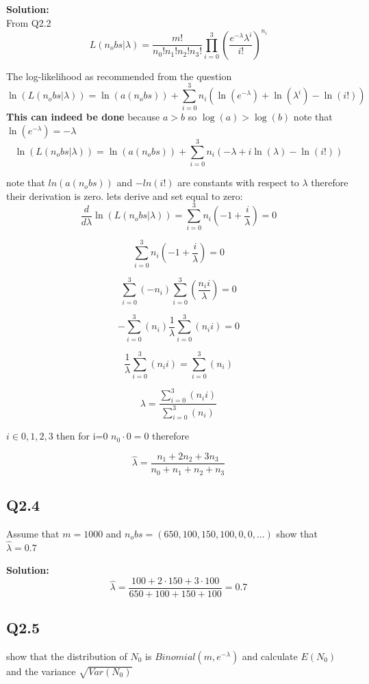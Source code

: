 \indent \textbf{Solution:} \\

From Q2.2
\[
    L(n_obs|\lambda) = \frac{m!}{n_0!n_1!n_2!n_3!} \prod_{i=0}^{3} \left( \frac{e^{-\lambda}\lambda^i}{i!} \right)^{n_i}     
\]

The log-likelihood as recommended from the question 
\[ 
    \ln(L(n_obs|\lambda)) = \ln(a(n_obs)) + \sum_{i=0}^{3} n_i \left(\ln(e^{-\lambda}) + \ln(\lambda^i) - \ln(i!) \right)
\]
\textbf{This can indeed be done} because $a>b$ so $\log(a) > \log(b)$
note that $\ln(e^{-\lambda}) = -\lambda $
\[ 
    \ln(L(n_obs|\lambda)) = \ln(a(n_obs)) + \sum_{i=0}^{3} n_i \left( -\lambda + i\ln(\lambda) - \ln(i!) \right)
\]

note that $ln(a(n_obs))$ and $-ln(i!)$ are constants with respect to $\lambda$ therefore their derivation is zero.
lets derive and set equal to zero:
\[
    \frac{d}{d\lambda} \ln(L(n_obs|\lambda)) = \sum_{i=0}^{3} n_i (-1+\frac{i}{\lambda}) = 0
\]

\[
    \sum_{i=0}^{3} n_i (-1+\frac{i}{\lambda}) = 0    
\]

\[
    \sum_{i=0}^{3}(-n_i)  \sum_{i=0}^{3}(\frac{n_i i}{\lambda}) = 0    
\]

\[
    - \sum_{i=0}^{3}(n_i)  \frac{1}{\lambda}\sum_{i=0}^{3}(n_i i) = 0    
\]

\[
    \frac{1}{\lambda}\sum_{i=0}^{3}(n_i i) = \sum_{i=0}^{3}(n_i)    
\]

\[
    \lambda = \frac{\sum_{i=0}^{3}(n_i i)}{\sum_{i=0}^{3}(n_i)    }  
\]

$i \in {0,1,2,3}$ then for i=0 $n_0 \cdot 0 = 0 $ therefore

\[
   \hat{\lambda} = \frac{n_1 + 2 n_2  + 3 n_3  }{n_0 + n_1 + n_2 + n_3}  
\]

\subsection{Q2.4}
Assume that $m = 1000$ and $n_obs = (650,100,150,100,0,0,\dots)$ show that $\hat{\lambda} = 0.7 $

\indent \textbf{Solution:} \\
\[
   \hat{\lambda} = \frac{100 + 2\cdot 150  + 3\cdot 100  }{650 + 100 + 150 + 100} = 0.7  
\]

\subsection{Q2.5}
show that the distribution of $N_0$ is $Binomial(m,e^{-\lambda})$ and calculate $E(N_0)$
and the variance $\sqrt{Var(N_0)}$

